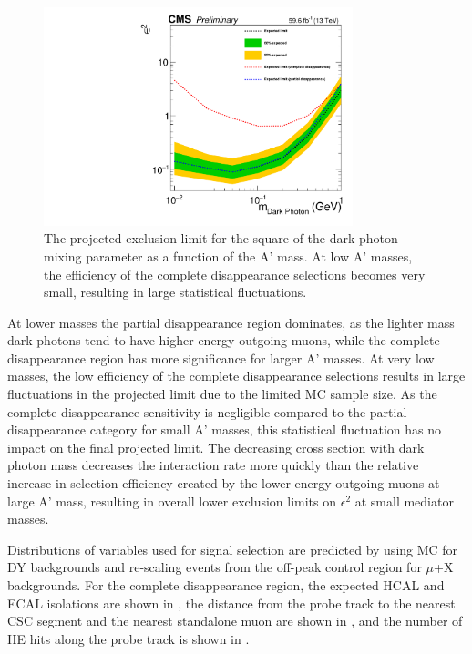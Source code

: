 \begin{figure}[htbp]
	\centering
	\includegraphics[width=0.8\textwidth]{figures/Limit_AllRegions.pdf}
	\caption[Projected Exclusion Limits on the Dark Photon Mixing Parameter]{The projected exclusion limit for the square of the dark photon mixing parameter as a function of the A' mass. At low A' masses, the efficiency of the complete disappearance selections becomes very small, resulting in large statistical fluctuations.}
	\label{fig:limits}
\end{figure}

At lower masses the partial disappearance region dominates, as the lighter mass dark photons tend to have higher energy outgoing muons, while the complete disappearance region has more significance for larger A' masses. 
At very low masses, the low efficiency of the complete disappearance selections results in large fluctuations in the projected limit due to the limited MC sample size. 
As the complete disappearance sensitivity is negligible compared to the partial disappearance category for small A' masses, this statistical fluctuation has no impact on the final projected limit.
The decreasing cross section with dark photon mass decreases the interaction rate more quickly than the relative increase in selection efficiency created by the lower energy outgoing muons at large A' mass, resulting in overall lower exclusion limits on $\epsilon^{2}$ at small mediator masses. 

Distributions of variables used for signal selection are predicted by using MC for DY backgrounds and re-scaling events from the off-peak control region for $\mu$+X backgrounds.
For the complete disappearance region, the expected HCAL and ECAL isolations are shown in , the distance from the probe track to the nearest CSC segment and the nearest standalone muon are shown in , and the number of HE hits along the probe track is shown in .

